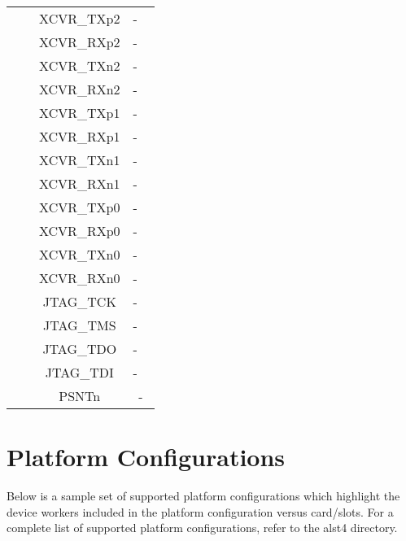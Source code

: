 \begin{longtable}[l]{|c|c|c|c|}
  & & XCVR\_TXp2 & - \
  \\\cline{3-4}
  & & XCVR\_RXp2 & - \
  \\\cline{3-4}
  & & XCVR\_TXn2 & - \
  \\\cline{3-4}
  & & XCVR\_RXn2 & - \
  \\\cline{3-4}
  & & XCVR\_TXp1 & - \
  \\\cline{3-4}
  & & XCVR\_RXp1 & - \
  \\\cline{3-4}
  & & XCVR\_TXn1 & - \
  \\\cline{3-4}
  & & XCVR\_RXn1 & - \
  \\\cline{3-4}
  & & XCVR\_TXp0 & - \
  \\\cline{3-4}
  & & XCVR\_RXp0 & - \
  \\\cline{3-4}
  & & XCVR\_TXn0 & - \
  \\\cline{3-4}
  & & XCVR\_RXn0 & - \
  \\\cline{3-4}
  & & JTAG\_TCK & - \
  \\\cline{3-4}
  & & JTAG\_TMS & - \
  \\\cline{3-4}
  & & JTAG\_TDO & - \
  \\\cline{3-4}
  & & JTAG\_TDI & - \
  \\\cline{3-4}
  & & PSNTn & - \\
	\hline
\end{longtable}
\newpage

\section*{Platform Configurations}
Below is a sample set of supported platform configurations which  highlight the device workers included in the platform configuration versus card/slots. For a complete list of supported platform configurations, refer to the alst4 directory. \\

